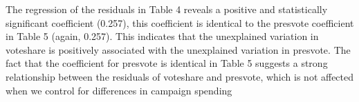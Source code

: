 \documentclass[12pt,letterpaper]{article}
\begin{document}
The regression of the residuals in Table 4 reveals a positive and statistically significant coefficient (0.257), this coefficient is identical to the presvote coefficient in Table 5 (again, 0.257). This indicates that the unexplained variation in voteshare is positively associated with the unexplained variation in presvote. The fact that the coefficient for presvote is identical in Table 5 suggests a strong relationship between the residuals of voteshare and presvote, which is not affected when we control for differences in campaign spending

	 
\end{document}
